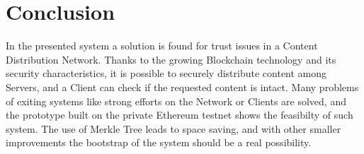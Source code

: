 \documentclass[hidelinks,conference,compsoc]{IEEEtran}
\begin{document}




\section{Conclusion}

In the presented system a solution is found for trust issues in a Content Distribution Network. Thanks to the growing Blockchain technology and its security characteristics, it is possible to securely distribute content among Servers, and a Client can check if the requested content is intact. Many problems of exiting systems like strong efforts on the Network or Clients are solved, and the prototype built on the private Ethereum testnet shows the feasibilty of such system. The use of Merkle Tree leads to space saving, and with other smaller improvements the bootstrap of the system should be a real possibility.









%







\end{document}
